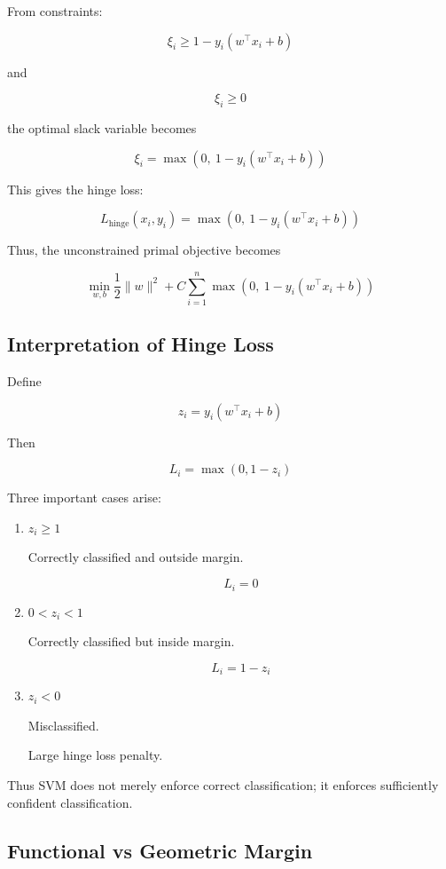 \documentclass[10pt,a4paper]{article}
\begin{document}
		From constraints:
		
		\[
		\xi_i \ge 1-y_i(w^\top x_i+b)
		\]
		
		and
		
		\[
		\xi_i \ge 0
		\]
		
		the optimal slack variable becomes
		
		\[
		\xi_i =
		\max\left(0,\ 1-y_i(w^\top x_i+b)\right)
		\]
		
		This gives the hinge loss:
		
		\[
		L_{\text{hinge}}(x_i,y_i)=
		\max\left(0,\ 1-y_i(w^\top x_i+b)\right)
		\]
		
		Thus, the unconstrained primal objective becomes
		
		\[
		\min_{w,b}
		\frac{1}{2}\|w\|^2
		+
		C\sum_{i=1}^{n}
		\max\left(0,\ 1-y_i(w^\top x_i+b)\right)
		\]
		
		\subsection{Interpretation of Hinge Loss}
		
		Define
		
		\[
		z_i = y_i(w^\top x_i+b)
		\]
		
		Then
		
		\[
		L_i=\max(0,1-z_i)
		\]
		
		Three important cases arise:
		
		\begin{enumerate}
		    \item $z_i \ge 1$
		
		    Correctly classified and outside margin.
		
		    \[
		    L_i=0
		    \]
		
		    \item $0<z_i<1$
		
		    Correctly classified but inside margin.
		
		    \[
		    L_i=1-z_i
		    \]
		
		    \item $z_i<0$
		
		    Misclassified.
		
		    Large hinge loss penalty.
		\end{enumerate}
		
		Thus SVM does not merely enforce correct classification; it enforces sufficiently confident classification.
		
		\subsection{Functional vs Geometric Margin}
		
\end{document}
